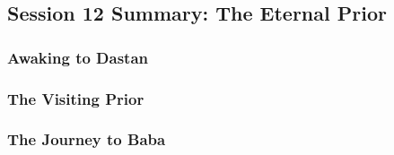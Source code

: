 \subsection{Session 12 Summary: The Eternal Prior}

\subsubsection{Awaking to Dastan}



\subsubsection{The Visiting Prior}



\subsubsection{The Journey to Baba}